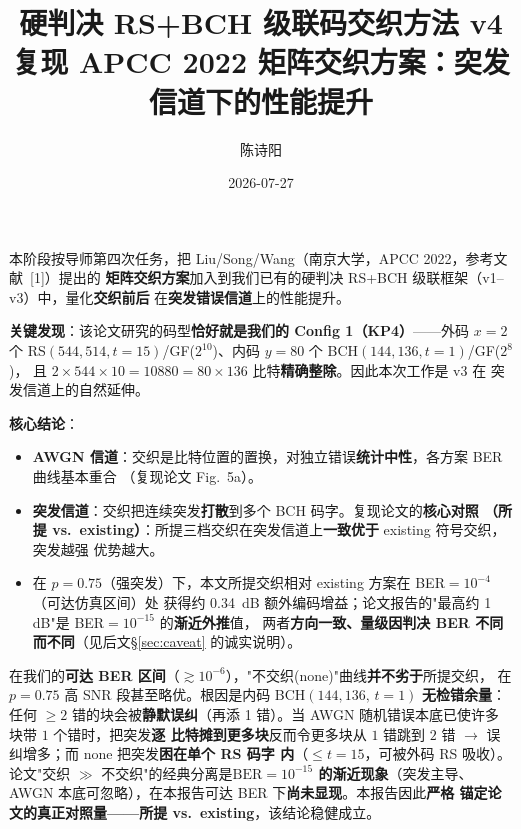\documentclass[11pt,a4paper]{article}
\title{硬判决 RS+BCH 级联码交织方法 v4\\
       {\large 复现 APCC 2022 矩阵交织方案：突发信道下的性能提升}}
\author{陈诗阳}
\date{2026-07-27}
\begin{document}
\maketitle

\begin{keybox}[title=\textbf{v4 任务与摘要}]
本阶段按导师第四次任务，把 Liu/Song/Wang（南京大学，APCC 2022，参考文献~[1]）提出的
\textbf{矩阵交织方案}加入到我们已有的硬判决 RS+BCH 级联框架（v1--v3）中，量化\textbf{交织前后}
在\textbf{突发错误信道}上的性能提升。

\textbf{关键发现}：该论文研究的码型\textbf{恰好就是我们的 Config 1（KP4）}——外码 $x{=}2$ 个
RS$(544,514,t{=}15)$/GF($2^{10}$)、内码 $y{=}80$ 个 BCH$(144,136,t{=}1)$/GF($2^{8}$)，
且 $2\times544\times10=10880=80\times136$ 比特\textbf{精确整除}。因此本次工作是 v3 在
突发信道上的自然延伸。

\textbf{核心结论}：
\begin{itemize}[leftmargin=1.5em, itemsep=1pt, topsep=2pt]
\item \textbf{AWGN 信道}：交织是比特位置的置换，对独立错误\textbf{统计中性}，各方案 BER 曲线基本重合
      （复现论文 Fig.~5a）。
\item \textbf{突发信道}：交织把连续突发\textbf{打散}到多个 BCH 码字。复现论文的\textbf{核心对照
      （所提 vs.\ existing）}：所提三档交织在突发信道上\textbf{一致优于} existing 符号交织，突发越强
      优势越大。
\item 在 $p{=}0.75$（强突发）下，本文所提交织相对 existing 方案在 BER$=10^{-4}$（可达仿真区间）处
      获得约 0.34~dB 额外编码增益；论文报告的"最高约 1\,dB"是 BER$=10^{-15}$ 的\textbf{渐近外推}值，
      两者\textbf{方向一致、量级因判决 BER 不同而不同}（见后文\S\ref{sec:caveat} 的诚实说明）。
\end{itemize}
\end{keybox}

\begin{warnbox}[title=\textbf{一个必须诚实交代的观察}]
在我们的\textbf{可达 BER 区间}（$\gtrsim 10^{-6}$），"不交织(none)"曲线\textbf{并不劣于}所提交织，
在 $p{=}0.75$ 高 SNR 段甚至略优。根因是内码 BCH$(144,136,\,t{=}1)$ \textbf{无检错余量}：任何 $\ge 2$
错的块会被\textbf{静默误纠}（再添 1 错）。当 AWGN 随机错误本底已使许多块带 $1$ 个错时，把突发\textbf{逐
比特摊到更多块}反而令更多块从 $1$ 错跳到 $2$ 错 $\to$ 误纠增多；而 none 把突发\textbf{困在单个 RS 码字
内}（$\le t{=}15$，可被外码 RS 吸收）。论文"交织 $\gg$ 不交织"的经典分离是\textbf{$\text{BER}=10^{-15}$
的渐近现象}（突发主导、AWGN 本底可忽略），在本报告可达 BER 下\textbf{尚未显现}。本报告因此\textbf{严格
锚定论文的真正对照量——所提 vs.\ existing}，该结论稳健成立。
\end{warnbox}
\end{document}
